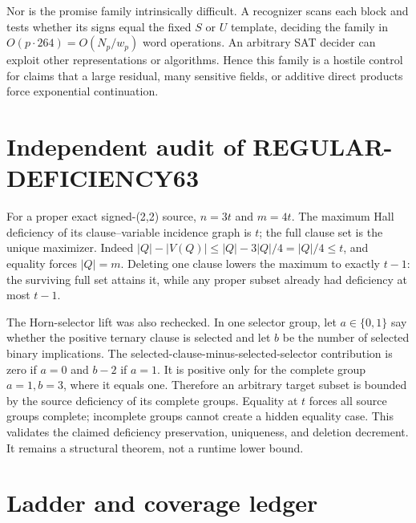 \documentclass[11pt]{article}
\begin{document}
Nor is the promise family intrinsically difficult.  A recognizer scans each block and tests
whether its signs equal the fixed $S$ or $U$ template, deciding the family in
$O(p\cdot264)=O(N_p/w_p)$ word operations.  An arbitrary SAT decider can exploit other
representations or algorithms.  Hence this family is a hostile control for claims that a
large residual, many sensitive fields, or additive direct products force exponential
continuation.

\section{Independent audit of REGULAR-DEFICIENCY63}

For a proper exact signed-(2,2) source, $n=3t$ and $m=4t$.  The maximum Hall deficiency of
its clause--variable incidence graph is $t$; the full clause set is the unique maximizer.
Indeed $|Q|-|V(Q)|\leq |Q|-3|Q|/4=|Q|/4\leq t$, and equality forces
$|Q|=m$.  Deleting one clause lowers the maximum to exactly $t-1$: the surviving full set
attains it, while any proper subset already had deficiency at most $t-1$.

The Horn-selector lift was also rechecked.  In one selector group, let $a\in\{0,1\}$ say
whether the positive ternary clause is selected and let $b$ be the number of selected binary
implications.  The selected-clause-minus-selected-selector contribution is zero if $a=0$
and $b-2$ if $a=1$.  It is positive only for the complete group $a=1,b=3$, where it equals
one.  Therefore an arbitrary target subset is bounded by the source deficiency of its
complete groups.  Equality at $t$ forces all source groups complete; incomplete groups
cannot create a hidden equality case.  This validates the claimed deficiency preservation,
uniqueness, and deletion decrement.  It remains a structural theorem, not a runtime lower
bound.

\section{Ladder and coverage ledger}
\end{document}
